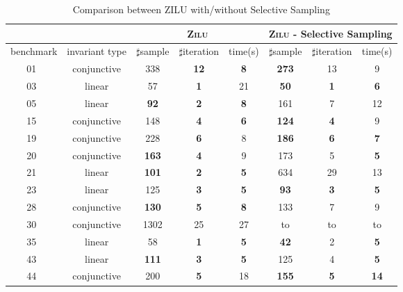 \begin{table}[t]
\centering
\caption{Comparison between ZILU with/without Selective Sampling}
\begin{tabular}{l c | c c c | c c c |}
\cline{3-8}
& &\multicolumn{3}{|c|}{\textsc{Zilu}}&\multicolumn{3}{c|}{\textsc{Zilu} - Selective Sampling}\\
\hline
\multicolumn{1}{|c|}{benchmark}&\multicolumn{1}{|c|}{invariant type}& $\sharp$sample & $\sharp$iteration & time(s) & $\sharp$sample & $\sharp$iteration &time(s) \\
\hline
\multicolumn{1}{|c|}{01~\cite{isil2013inductive}}				&conjunctive	&338  &\textbf{12}	&\textbf{8}	&\textbf{273}	&13	&9\\
\multicolumn{1}{|c|}{03~\cite{isil2013inductive}}				&linear			&57	&\textbf{1}	&21	&\textbf{50}	&\textbf{1}	&\textbf{6}\\
\multicolumn{1}{|c|}{05~\cite{isil2013inductive}}				&linear 		&\textbf{92}	&\textbf{2}	&\textbf{8}	&161	&7	&12\\
\multicolumn{1}{|c|}{15~\cite{isil2013inductive}}				&conjunctive	&148	&\textbf{4}	&\textbf{6}	&\textbf{124}	&\textbf{4}	&9\\
\multicolumn{1}{|c|}{19~\cite{isil2013inductive}}				&conjunctive	&228	&\textbf{6}	&8	&\textbf{186}	&\textbf{6}	&\textbf{7}\\
\multicolumn{1}{|c|}{20~\cite{isil2013inductive}}				&conjunctive	&\textbf{163}	&\textbf{4}	&9	&173	&5	&\textbf{5}\\
\multicolumn{1}{|c|}{21~\cite{isil2013inductive}}				&linear			&\textbf{101}	&\textbf{2}	&\textbf{5}	&634	&29	&13\\
\multicolumn{1}{|c|}{23~\cite{isil2013inductive}}				&linear			&125	&\textbf{3}	&\textbf{5}	&\textbf{93}	&\textbf{3}	&\textbf{5}\\
\multicolumn{1}{|c|}{28~\cite{isil2013inductive}}				&conjunctive	&\textbf{130}	&\textbf{5}	&\textbf{8}	     &133	&7	&9						\\
\multicolumn{1}{|c|}{30~\cite{isil2013inductive}}				&conjunctive	&1302	&25	&27&to	&to	&to\\
\multicolumn{1}{|c|}{35~\cite{isil2013inductive}}				&linear			&58	&\textbf{1}	&\textbf{5}	       &\textbf{42}	&2	&\textbf{5}		\\
\multicolumn{1}{|c|}{43~\cite{isil2013inductive}}				&linear			&\textbf{111}	&\textbf{3}	&\textbf{5}	   &125	&4	&\textbf{5}		\\
\multicolumn{1}{|c|}{44~\cite{isil2013inductive}}				&conjunctive	&200	&\textbf{5}	&18	&\textbf{155}	&\textbf{5}	&\textbf{14}\\

\end{tabular}
\end{table}
